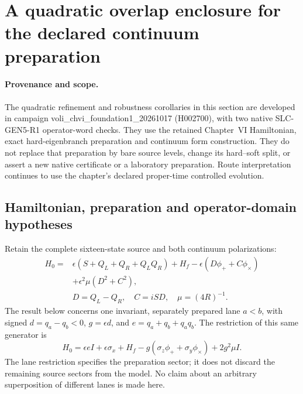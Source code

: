 
\section{A quadratic overlap enclosure for the declared continuum preparation}
\label{sec:chvi-foundation-overlap}

\paragraph{Provenance and scope.}
The quadratic refinement and robustness corollaries in this section are
developed in campaign voli\_chvi\_foundation1\_20261017 (H002700), with two
native SLC-GEN5-R1 operator-word checks. They use the retained Chapter~VI Hamiltonian, exact hard-eigenbranch
preparation and continuum form construction. They do not replace that
preparation by bare source levels, change its hard--soft split, or assert a
new native certificate or a laboratory preparation. Route interpretation
continues to use the chapter's declared proper-time controlled evolution.

\subsection{Hamiltonian, preparation and operator-domain hypotheses}

Retain the complete sixteen-state source and both continuum polarizations:
\begin{equation}
\begin{split}
 H_0={}&\epsilon(S+Q_L+Q_R+Q_LQ_R)+H_f
       -\epsilon(D\phi_++C\phi_\times)\\
      &+\epsilon^2\mu(D^2+C^2),
 \\ &D=Q_L-Q_R,\quad C=iSD,\quad \mu=(4R)^{-1}.
\end{split}
\label{eq:chvi-foundation-full-generator}
\end{equation}
The result below concerns one invariant, separately prepared lane
$a<b$, with signed $d=q_a-q_b<0$, $g=\epsilon d$, and
$e=q_a+q_b+q_aq_b$. The restriction of this same generator is
\begin{equation}
 H_0=\epsilon eI+\epsilon\sigma_x+H_f
   -g(\sigma_z\phi_++\sigma_y\phi_\times)+2g^2\mu I.
\label{eq:chvi-foundation-lane-generator}
\end{equation}
The lane restriction specifies the preparation sector; it does not discard
the remaining source sectors from the model. No claim about an arbitrary
superposition of different lanes is made here.

